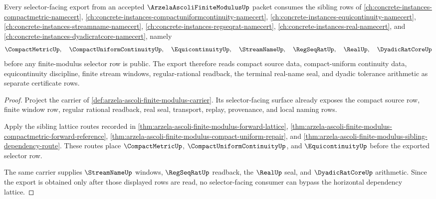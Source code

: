 \begin{theorem}
\label{thm:arzela-ascoli-finite-modulus-sibling-lattice-repair}
Every selector-facing export from an accepted $\ArzelaAscoliFiniteModulusUp$ packet consumes the sibling rows of \autoref{ch:concrete-instances-compactmetric-namecert}, \autoref{ch:concrete-instances-compactuniformcontinuity-namecert}, \autoref{ch:concrete-instances-equicontinuity-namecert}, \autoref{ch:concrete-instances-streamname-namecert}, \autoref{ch:concrete-instances-regseqrat-namecert}, \autoref{ch:concrete-instances-real-namecert}, and \autoref{ch:concrete-instances-dyadicratcore-namecert}, namely
$$
\CompactMetricUp,\quad \CompactUniformContinuityUp,\quad \EquicontinuityUp,\quad \StreamNameUp,\quad \RegSeqRatUp,\quad \RealUp,\quad \DyadicRatCoreUp
$$
before any finite-modulus selector row is public. The export therefore reads compact source data, compact-uniform continuity data, equicontinuity discipline, finite stream windows, regular-rational readback, the terminal real-name seal, and dyadic tolerance arithmetic as separate certificate rows.
\end{theorem}
\begin{proof}
Project the carrier of \autoref{def:arzela-ascoli-finite-modulus-carrier}. Its selector-facing surface already exposes the compact source row, finite window row, regular rational readback, real seal, transport, replay, provenance, and local naming rows.

Apply the sibling lattice routes recorded in \autoref{thm:arzela-ascoli-finite-modulus-forward-lattice}, \autoref{thm:arzela-ascoli-finite-modulus-compactmetric-forward-reference}, \autoref{thm:arzela-ascoli-finite-modulus-compact-uniform-repair}, and \autoref{thm:arzela-ascoli-finite-modulus-sibling-dependency-route}. These routes place $\CompactMetricUp$, $\CompactUniformContinuityUp$, and $\EquicontinuityUp$ before the exported selector row.

The same carrier supplies $\StreamNameUp$ windows, $\RegSeqRatUp$ readback, the $\RealUp$ seal, and $\DyadicRatCoreUp$ arithmetic. Since the export is obtained only after those displayed rows are read, no selector-facing consumer can bypass the horizontal dependency lattice.
\end{proof}

